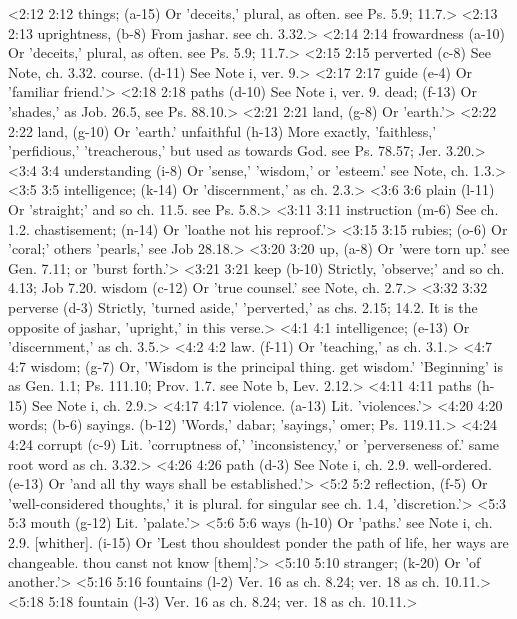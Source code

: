 <2:12 2:12  things; (a-15)  Or 'deceits,' plural, as often. see Ps. 5.9; 11.7.>
<2:13 2:13  uprightness, (b-8)  From jashar. see ch. 3.32.>
<2:14 2:14  frowardness (a-10)  Or 'deceits,' plural, as often. see Ps. 5.9; 11.7.>
<2:15 2:15  perverted (c-8)  See Note, ch. 3.32.
  course. (d-11)  See Note i, ver. 9.>
<2:17 2:17  guide (e-4)  Or 'familiar friend.'>
<2:18 2:18  paths (d-10)  See Note i, ver. 9.
  dead; (f-13)  Or 'shades,' as Job. 26.5, see Ps. 88.10.>
<2:21 2:21  land, (g-8)  Or 'earth.'>
<2:22 2:22  land, (g-10)  Or 'earth.'
  unfaithful (h-13)  More exactly, 'faithless,' 'perfidious,' 'treacherous,' but  used as towards God. see Ps. 78.57; Jer. 3.20.>
<3:4 3:4  understanding (i-8)  Or 'sense,' 'wisdom,' or 'esteem.' see Note, ch. 1.3.>
<3:5 3:5  intelligence; (k-14)  Or 'discernment,' as ch. 2.3.>
<3:6 3:6  plain (l-11)  Or 'straight;' and so ch. 11.5. see Ps. 5.8.>
<3:11 3:11  instruction (m-6)  See ch. 1.2.
  chastisement; (n-14)  Or 'loathe not his reproof.'>
<3:15 3:15  rubies; (o-6)  Or 'coral;' others 'pearls,' see Job 28.18.>
<3:20 3:20  up, (a-8)  Or 'were torn up.' see Gen. 7.11; or 'burst forth.'>
<3:21 3:21  keep (b-10)  Strictly, 'observe;' and so ch. 4.13; Job 7.20.
  wisdom (c-12)  Or 'true counsel.' see Note, ch. 2.7.>
<3:32 3:32  perverse (d-3)  Strictly, 'turned aside,' 'perverted,' as chs. 2.15; 14.2. It  is the opposite of jashar, 'upright,' in this verse.>
<4:1 4:1  intelligence; (e-13)  Or 'discernment,' as ch. 3.5.>
<4:2 4:2  law. (f-11)  Or 'teaching,' as ch. 3.1.>
<4:7 4:7  wisdom; (g-7)  Or, 'Wisdom is the principal thing. get wisdom.' 'Beginning'  is as Gen. 1.1; Ps. 111.10; Prov. 1.7. see Note b, Lev. 2.12.>
<4:11 4:11  paths (h-15)  See Note i, ch. 2.9.>
<4:17 4:17  violence. (a-13)  Lit. 'violences.'>
<4:20 4:20  words; (b-6)  sayings. (b-12)
  'Words,' dabar; 'sayings,' omer; Ps. 119.11.>
<4:24 4:24  corrupt (c-9)  Lit. 'corruptness of,' 'inconsistency,' or 'perverseness of.'  same root word as ch. 3.32.>
<4:26 4:26  path (d-3)  See Note i, ch. 2.9.
  well-ordered. (e-13)  Or 'and all thy ways shall be established.'>
<5:2 5:2  reflection, (f-5)  Or 'well-considered thoughts,' it is plural. for singular see  ch. 1.4, 'discretion.'>
<5:3 5:3  mouth (g-12)  Lit. 'palate.'>
<5:6 5:6  ways (h-10)  Or 'paths.' see Note i, ch. 2.9.
  [whither]. (i-15)  Or 'Lest thou shouldest ponder the path of life, her ways are  changeable. thou canst not know [them].'>
<5:10 5:10  stranger; (k-20)  Or 'of another.'>
<5:16 5:16  fountains (l-2) Ver. 16 as ch. 8.24; ver. 18 as ch. 10.11.>
<5:18 5:18  fountain (l-3)  Ver. 16 as ch. 8.24; ver. 18 as ch. 10.11.>
